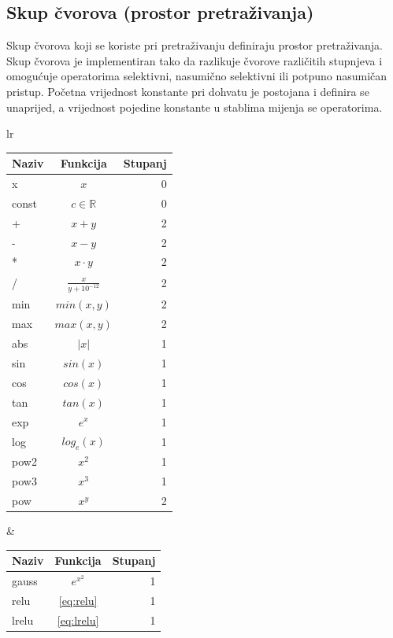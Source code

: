 \documentclass[times, utf8, numeric, diplomski]{fer}
\def\realnum{\mathbb{R}}
\begin{document}
\newpage

\subsection{Skup čvorova (prostor pretraživanja)}
\label{sec:node_set}
Skup čvorova koji se koriste pri pretraživanju definiraju prostor pretraživanja. Skup čvorova je implementiran tako da razlikuje čvorove različitih stupnjeva i omogućuje operatorima selektivni, nasumično selektivni ili potpuno nasumičan pristup. Početna vrijednost konstante pri dohvatu je postojana i definira se unaprijed, a vrijednost pojedine konstante u stablima mijenja se operatorima.

\begin{table}[H]
\centering
\begin{tabular}[t]{lr}
\begin{tabular}[t]{l|c|r}
\textbf{Naziv} & \textbf{Funkcija} & \textbf{Stupanj} \\
\hline
x		& $x$					& 0 \\
const	& $c \in \realnum$		& 0 \\
\hline
+		& $x + y$				& 2 \\
-		& $x - y$				& 2 \\
*		& $x \cdot y$			& 2 \\
/		& $\frac{x}{y + 10^{-12}}$	& 2 \\
\hline
min		& $min(x, y)$			& 2 \\
max		& $max(x, y)$			& 2 \\
abs		& $|x|$					& 1 \\
\hline
sin		& $sin(x)$				& 1 \\
cos		& $cos(x)$				& 1 \\
tan		& $tan(x)$				& 1 \\
\hline
exp		& $e^x$					& 1 \\
log		& $log_e(x)$				& 1 \\
pow2		& $x^2$					& 1 \\
pow3		& $x^3$					& 1 \\
pow		& $x^y$					& 2 \\
\end{tabular}
& \quad
\begin{tabular}[t]{l|c|r}
\textbf{Naziv} & \textbf{Funkcija} & \textbf{Stupanj} \\
\hline
gauss	& $e^{x^2}$		& 1 \\
relu		& \eqref{eq:relu}		& 1 \\
lrelu	& \eqref{eq:lrelu}		& 1 \\

\end{tabular}
\end{tabular}
\end{table}
\end{document}

